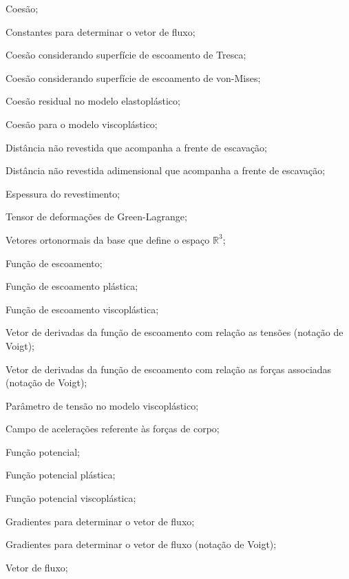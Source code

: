 

\item[\textbf{Latino minúsculo:}]
\item[$c$]				Coesão;
\item[$c_1, c_2, c_3$]	Constantes para determinar o vetor de fluxo;
\item[$c_{TR}$]			Coesão considerando superfície de escoamento de Tresca;
\item[$c_{VM}$]			Coesão considerando superfície de escoamento de von-Mises;
\item[$c_0$]			Coesão residual no modelo elastoplástico;
\item[$c_1$]			Coesão para o modelo viscoplástico;
\item[$d_0$]			Distância não revestida que acompanha a frente de escavação;
\item[$d_0^*$]			Distância não revestida adimensional que acompanha a frente de escavação;
\item[$e_{rev}$]		Espessura do revestimento;
\item[$ \greenll $] 	Tensor de deformações de Green-Lagrange;
\item[$\euml, \edoisl, \etresl$] Vetores ortonormais da base que define o espaço $\mathbb{R}^3$;
\item[$f$]				Função de escoamento;
\item[$f^p$]				Função de escoamento plástica;
\item[$f^{vp}$]				Função de escoamento viscoplástica;
\item[$\dfdsl$]			Vetor de derivadas da função de escoamento com relação as tensões (notação de Voigt);
\item[$\dfdql$]			Vetor de derivadas da função de escoamento com relação as forças associadas (notação de Voigt);
\item[$f_0$]			Parâmetro de tensão no modelo viscoplástico;
\item[$\fl$]					Campo de acelerações referente às forças de corpo;
\item[$g$]				Função potencial;
\item[$g^p$]				Função potencial plástica;
\item[$g^{vp}$]				Função potencial viscoplástica;
\item[$\gllum, \glldois, \glltres$] Gradientes para determinar o vetor de fluxo;
\item[$\gl_1, \gl_2, \gl_3$] Gradientes para determinar o vetor de fluxo (notação de Voigt);
\item[$\dgdsll$]		Vetor de fluxo;
